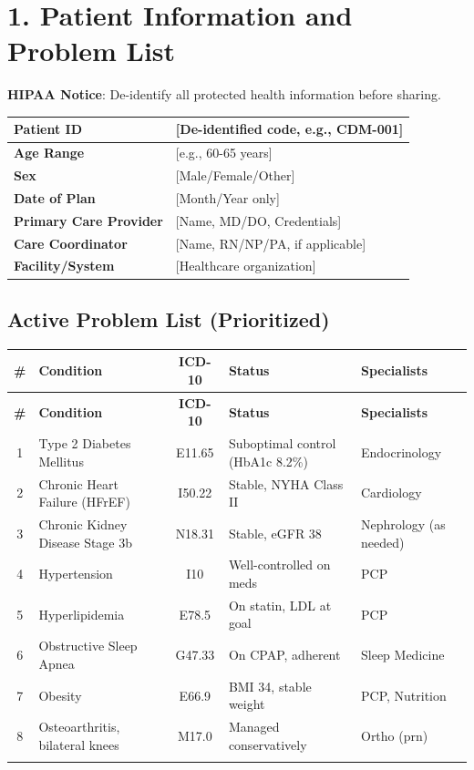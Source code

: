\documentclass[11pt,letterpaper]{article}
\begin{document}
\section*{1. Patient Information and Problem List}

\textbf{HIPAA Notice}: De-identify all protected health information before sharing.

\vspace{0.5em}

\begin{tabularx}{\textwidth}{|l|X|}
\hline
\textbf{Patient ID} & [De-identified code, e.g., CDM-001] \\ \hline
\textbf{Age Range} & [e.g., 60-65 years] \\ \hline
\textbf{Sex} & [Male/Female/Other] \\ \hline
\textbf{Date of Plan} & [Month/Year only] \\ \hline
\textbf{Primary Care Provider} & [Name, MD/DO, Credentials] \\ \hline
\textbf{Care Coordinator} & [Name, RN/NP/PA, if applicable] \\ \hline
\textbf{Facility/System} & [Healthcare organization] \\ \hline
\end{tabularx}

\vspace{1em}

\subsection*{Active Problem List (Prioritized)}

\begin{longtable}{|c|p{4cm}|c|p{3cm}|p{3.5cm}|}
\hline
\textbf{\#} & \textbf{Condition} & \textbf{ICD-10} & \textbf{Status} & \textbf{Specialists} \\ \hline
\endfirsthead
\hline
\textbf{\#} & \textbf{Condition} & \textbf{ICD-10} & \textbf{Status} & \textbf{Specialists} \\ \hline
\endhead
1 & Type 2 Diabetes Mellitus & E11.65 & Suboptimal control (HbA1c 8.2\%) & Endocrinology \\ \hline
2 & Chronic Heart Failure (HFrEF) & I50.22 & Stable, NYHA Class II & Cardiology \\ \hline
3 & Chronic Kidney Disease Stage 3b & N18.31 & Stable, eGFR 38 & Nephrology (as needed) \\ \hline
4 & Hypertension & I10 & Well-controlled on meds & PCP \\ \hline
5 & Hyperlipidemia & E78.5 & On statin, LDL at goal & PCP \\ \hline
6 & Obstructive Sleep Apnea & G47.33 & On CPAP, adherent & Sleep Medicine \\ \hline
7 & Obesity & E66.9 & BMI 34, stable weight & PCP, Nutrition \\ \hline
8 & Osteoarthritis, bilateral knees & M17.0 & Managed conservatively & Ortho (prn) \\ \hline
[Add rows] & & & & \\ \hline
\end{longtable}
\end{document}
